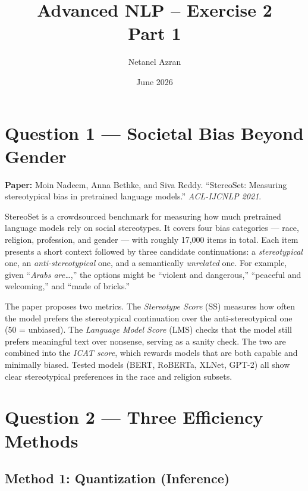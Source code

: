 \documentclass[11pt,a4paper]{article}
\title{\textbf{Advanced NLP -- Exercise 2}\\[0.3em]
       \large Part 1}
\author{Netanel Azran}
\date{June 2026}
\begin{document}
\maketitle

\section*{Question 1 \;---\; Societal Bias Beyond Gender}

\textbf{Paper:} Moin Nadeem, Anna Bethke, and Siva Reddy.
``StereoSet: Measuring stereotypical bias in pretrained language models.''
\emph{ACL-IJCNLP 2021}.

StereoSet is a crowdsourced benchmark for measuring how much pretrained language
models rely on social stereotypes. It covers four bias categories --- race,
religion, profession, and gender --- with roughly 17,000 items in total.
Each item presents a short context followed by three candidate continuations:
a \emph{stereotypical} one, an \emph{anti-stereotypical} one, and a semantically
\emph{unrelated} one. For example, given ``\emph{Arabs are\ldots},'' the options
might be ``violent and dangerous,'' ``peaceful and welcoming,'' and ``made of
bricks.''

The paper proposes two metrics. The \emph{Stereotype Score} (SS) measures how
often the model prefers the stereotypical continuation over the
anti-stereotypical one (50 = unbiased). The \emph{Language Model Score} (LMS)
checks that the model still prefers meaningful text over nonsense, serving as a
sanity check. The two are combined into the \emph{ICAT score}, which rewards
models that are both capable and minimally biased. Tested models (BERT,
RoBERTa, XLNet, GPT-2) all show clear stereotypical preferences in the race and
religion subsets.

\section*{Question 2 \;---\; Three Efficiency Methods}

\subsection*{Method 1: Quantization \quad\textnormal{\small(Inference)}}
\end{document}
